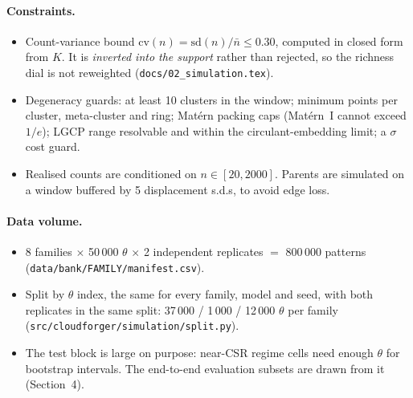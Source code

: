 \documentclass[twoside]{article}
\newcommand{\src}[1]{{\footnotesize\texttt{#1}}}
\newcommand{\nb}{\bar n}
\begin{document}
\paragraph{Constraints.}
\begin{itemize}
  \item Count-variance bound $\mathrm{cv}(n)=\mathrm{sd}(n)/\nb\le0.30$, computed in closed form from $K$. It is
        \emph{inverted into the support} rather than rejected, so the richness dial is not reweighted
        (\src{docs/02\_simulation.tex}).
  \item Degeneracy guards: at least 10 clusters in the window; minimum points per cluster, meta-cluster and ring;
        Mat\'ern packing caps (Mat\'ern~I cannot exceed $1/e$); LGCP range resolvable and within the
        circulant-embedding limit; a $\sigma$ cost guard.
  \item Realised counts are conditioned on $n\in[20,2000]$. Parents are simulated on a window buffered by 5
        displacement s.d.s, to avoid edge loss.
\end{itemize}

\paragraph{Data volume.}
\begin{itemize}
  \item 8 families $\times$ 50\,000 $\theta$ $\times$ 2 independent replicates $=$ 800\,000 patterns
        (\src{data/bank/FAMILY/manifest.csv}).
  \item Split by $\theta$ index, the same for every family, model and seed, with both replicates in the same split:
        37\,000 / 1\,000 / 12\,000 $\theta$ per family (\src{src/cloudforger/simulation/split.py}).
  \item The test block is large on purpose: near-CSR regime cells need enough $\theta$ for bootstrap intervals.
        The end-to-end evaluation subsets are drawn from it (Section~4).
\end{itemize}
\end{document}
